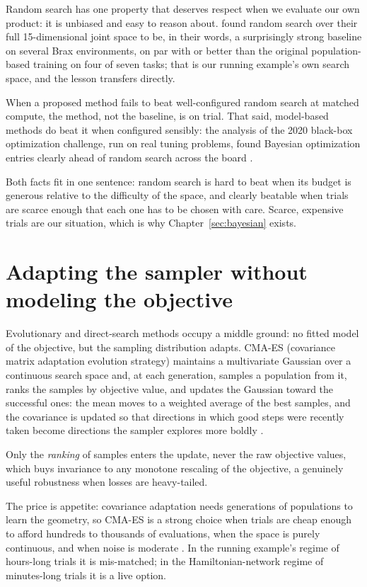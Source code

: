 Random search has one property that deserves respect when we evaluate our own
product: it is unbiased and easy to reason about. \citet{wan2022bgpbt} found
random search over their full 15-dimensional joint space to be, in their
words, a surprisingly strong baseline on several Brax environments, on par
with or better than the original population-based training on four of seven
tasks; that is our running example's own search space, and the lesson
transfers directly.

When a proposed method fails to beat well-configured
random search at matched compute, the method, not the baseline, is on trial.
That said, model-based methods do beat it when configured sensibly: the
analysis of the 2020 black-box optimization challenge, run on real tuning
problems, found Bayesian optimization entries clearly ahead of random search
across the board \citep{turner2021bayesian}.

Both facts fit in one sentence:
random search is hard to beat when its budget is generous relative to the
difficulty of the space, and clearly beatable when trials are scarce enough
that each one has to be chosen with care. Scarce, expensive trials are our
situation, which is why Chapter~\ref{sec:bayesian} exists.

\section{Adapting the sampler without modeling the objective}

Evolutionary and direct-search methods occupy a middle ground: no fitted
model of the objective, but the sampling distribution adapts. CMA-ES
(covariance matrix adaptation evolution strategy)
maintains a multivariate Gaussian over a continuous search space and, at
each generation, samples a population from it, ranks the samples by
objective value, and updates the Gaussian toward the successful ones: the
mean moves to a weighted average of the best samples, and the covariance is
updated so that directions in which good steps were recently taken become
directions the sampler explores more boldly \citep{hansen2016cmaes}.

Only
the \emph{ranking} of samples enters the update, never the raw objective
values, which buys invariance to any monotone rescaling of the objective, a
genuinely useful robustness when losses are heavy-tailed.

The price is
appetite: covariance adaptation needs generations of populations to learn
the geometry, so CMA-ES is a strong choice when trials are cheap enough to
afford hundreds to thousands of evaluations, when the space is purely
continuous, and when noise is moderate \citep{hansen2016cmaes}. In the
running example's regime of hours-long trials it is mis-matched; in the
Hamiltonian-network regime of minutes-long trials it is a live option.

